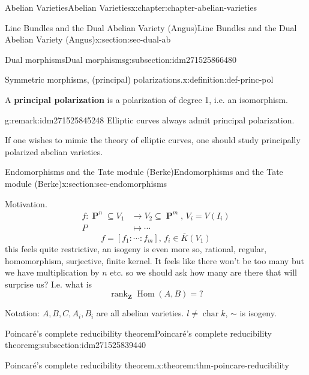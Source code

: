 \documentclass[oneside,10pt,]{book}
\newcommand{\terminology}[1]{\textbf{#1}}
\numberwithin{equation}{section}
\newcommand{\lb}{[}
\newcommand{\rb}{]}
\newcommand{\ZZ}{\mathbf{Z}}
\DeclareMathOperator{\Hom}{Hom}
\DeclareMathOperator{\rank}{rank}
\DeclareMathOperator{\characteristic}{char}
\DeclareMathOperator{\PP}{\mathbf{P}}
\newcommand{\amp}{&}
\begin{document}
\begin{chapterptx}{Abelian Varieties}{}{Abelian Varieties}{}{}{x:chapter:chapter-abelian-varieties}
\begin{sectionptx}{Line Bundles and the Dual Abelian Variety (Angus)}{}{Line Bundles and the Dual Abelian Variety (Angus)}{}{}{x:section:sec-dual-ab}
\begin{subsectionptx}{Dual morphisms}{}{Dual morphisms}{}{}{g:subsection:idm271525866480}
\begin{definition}{Symmetric morphisms, (principal) polarizations.}{x:definition:def-princ-pol}
\par
A \terminology{principal polarization} is a polarization of degree 1, i.e. an isomorphism.%
\end{definition}
\begin{remark}{}{g:remark:idm271525845248}%
Elliptic curves always admit principal polarization.%
\par
If one wishes to mimic the theory of elliptic curves, one should study principally polarized abelian varieties.%
\end{remark}
\end{subsectionptx}
\end{sectionptx}
%
%
\typeout{************************************************}
\typeout{************************************************}
%
\begin{sectionptx}{Endomorphisms and the Tate module (Berke)}{}{Endomorphisms and the Tate module (Berke)}{}{}{x:section:sec-endomorphisms}
\begin{introduction}{Motivation.}%
%
\begin{align*}
f \colon \PP^n\subseteq V_1 \amp\to V_2 \subseteq \PP^m,\,V_i = V(I_i)\\
P\amp \mapsto \cdots
\end{align*}
%
\begin{equation*}
f = \lb f_1 : \cdots : f_m\rb ,\,f_i\in \overline K (V_1)
\end{equation*}
this feels quite restrictive, an isogeny is even more so, rational, regular, homomorphism, surjective, finite kernel. It feels like there won't be too many but we have multiplication by \(n\) etc. so we should ask how many are there that will surprise us? I.e. what is%
\begin{equation*}
\rank_\ZZ \Hom(A,B) = ?
\end{equation*}
%
\par
Notation: \(A,B,C , A_i,  B_i\) are all abelian varieties. \(l \ne \characteristic k\), \(\sim\) is isogeny.%
\end{introduction}%
%
%
\typeout{************************************************}
\typeout{************************************************}
%
\begin{subsectionptx}{Poincaré's complete reducibility theorem}{}{Poincaré's complete reducibility theorem}{}{}{g:subsection:idm271525839440}
\begin{theorem}{Poincaré's complete reducibility theorem.}{}{x:theorem:thm-poincare-reducibility}%

\end{theorem}
\end{subsectionptx}
\end{sectionptx}
\end{chapterptx}
\end{document}
